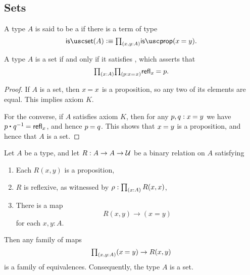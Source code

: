 \subsection{Sets}

\begin{defn}
A type $A$ is said to be a  if there is a term of type
\begin{equation*}
\isset(A)\defeq \prd{x,y:A}\isprop(\id{x}{y}).
\end{equation*}
\end{defn}

\begin{lem}
A type $A$ is a set if and only if it satisfies , which asserts that
\begin{equation*}
\prd{x:A}{p:\id{x}{x}}\id{\refl{x}}{p}.
\end{equation*}
\end{lem}

\begin{proof}
If $A$ is a set, then $\id{x}{x}$ is a proposition, so any two of its elements are equal. 
This implies axiom $K$. 

For the converse, if $A$ satisfies axiom $K$, then for any $p,q:\id{x}{y}$ we have $\id{\ct{p}{q^{-1}}}{\refl{x}}$, and hence $\id{p}{q}$. This shows that $\id{x}{y}$ is a proposition, and hence that $A$ is a set.
\end{proof}

\begin{thm}\label{lem:prop_to_id}
Let $A$ be a type, and let $R:A\to A\to\mathcal{U}$ be a binary relation on $A$ satisfying
\begin{enumerate}
\item Each $R(x,y)$ is a proposition,
\item $R$ is reflexive, as witnessed by $\rho:\prd{x:A}R(x,x)$,
\item There is a map
  \begin{equation*}
    R(x,y)\to (x=y)
  \end{equation*}
  for each $x,y:A$.
\end{enumerate}
Then any family of maps
\begin{equation*}
\prd{x,y:A}(\id{x}{y})\to R(x,y)
\end{equation*}
is a family of equivalences. Consequently, the type $A$ is a set.
\end{thm}

